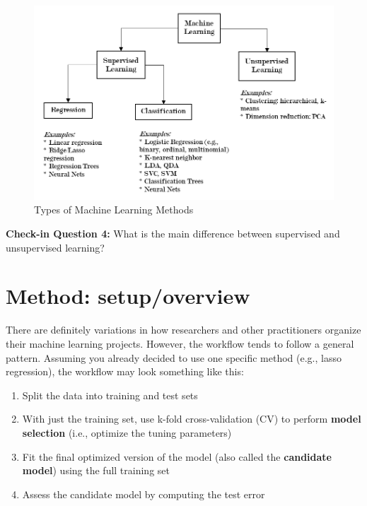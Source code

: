 \documentclass{book}
\newenvironment{shaded*}{
    \begin{center}
    \begin{tabular}{|p{0.9\textwidth}|}
    \hline\\
    }
    { 
    \\\\\hline
    \end{tabular} 
    \end{center}
}
\begin{document}
\begin{figure}
\centering
\includegraphics{images/ml/jl-figure4.png}
\caption{Types of Machine Learning Methods}
\end{figure}

\begin{shaded*}

\textbf{Check-in Question 4:} What is the main difference between supervised
and unsupervised learning?

\end{shaded*}

\hypertarget{method-setupoverview-3}{%
\section{Method: setup/overview}\label{method-setupoverview-3}}

There are definitely variations in how researchers and other practitioners
organize their machine learning projects. However, the workflow tends to
follow a general pattern. Assuming you already decided to use one specific
method (e.g., lasso regression), the workflow may look something like this:

\begin{enumerate}
\def\labelenumi{\arabic{enumi}.}
\item
  Split the data into training and test sets
\item
  With just the training set, use k-fold cross-validation (CV) to perform
  \textbf{model selection} (i.e., optimize the tuning parameters)
\item
  Fit the final optimized version of the model (also called the
  \textbf{candidate model}) using the full training set
\item
  Assess the candidate model by computing the test error
\end{enumerate}
\end{document}
